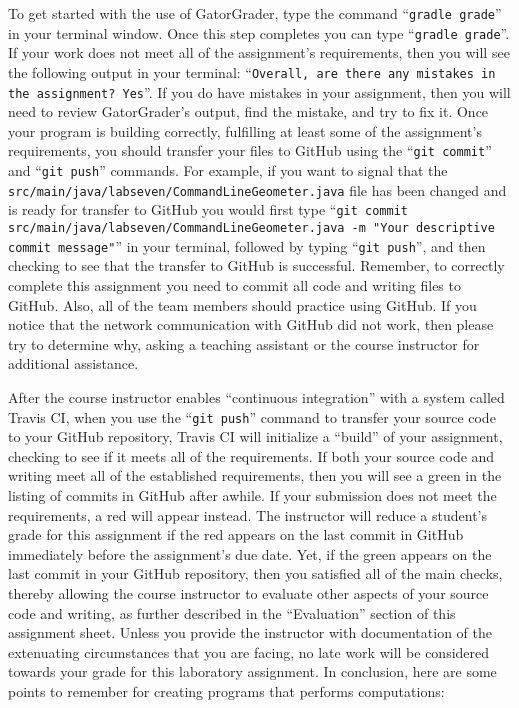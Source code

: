 \documentclass[11pt]{article}
\newcommand{\mainprogramsource}{\lstinline{src/main/java/labseven/CommandLineGeometer.java}}
\newcommand{\gatorgraderstart}{\command{gradle grade}}
\newcommand{\gatorgradercheck}{\command{gradle grade}}
\newcommand{\gitcommit}{\command{git commit}}
\newcommand{\gitpush}{\command{git push}}
\newcommand{\gitcommitmainprogram}{\command{git commit src/main/java/labseven/CommandLineGeometer.java -m "Your
descriptive commit message"}}
\newcommand{\command}[1]{``\lstinline{#1}''}
\newcommand{\step}[1]{``{#1}''}
\newcommand{\checkmark}{\ding{51}}
\newcommand{\naughtmark}{\ding{55}}
\begin{document}
To get started with the use of GatorGrader, type the command \gatorgraderstart{} in your terminal window. Once this step
completes you can type \gatorgradercheck{}. If your work does not meet all of the assignment's requirements, then you
will see the following output in your terminal: \command{Overall, are there any mistakes in the assignment? Yes}. If you
do have mistakes in your assignment, then you will need to review GatorGrader's output, find the mistake, and try to fix
it. Once your program is building correctly, fulfilling at least some of the assignment's requirements, you should
transfer your files to GitHub using the \gitcommit{} and \gitpush{} commands. For example, if you want to signal that
the \mainprogramsource{} file has been changed and is ready for transfer to GitHub you would first type
\gitcommitmainprogram{} in your terminal, followed by typing \gitpush{}, and then checking to see that the transfer to
GitHub is successful. Remember, to correctly complete this assignment you need to commit all code and writing files to
GitHub. Also, all of the team members should practice using GitHub. If you notice that the network communication with
GitHub did not work, then please try to determine why, asking a teaching assistant or the course instructor for
additional assistance.

After the course instructor enables \step{continuous integration} with a system called Travis CI, when you use the
\gitpush{} command to transfer your source code to your GitHub repository, Travis CI will initialize a \step{build} of
your assignment, checking to see if it meets all of the requirements. If both your source code and writing meet all of
the established requirements, then you will see a green \checkmark{} in the listing of commits in GitHub after awhile.
If your submission does not meet the requirements, a red \naughtmark{} will appear instead. The instructor will reduce a
student's grade for this assignment if the red \naughtmark{} appears on the last commit in GitHub immediately before the
assignment's due date. Yet, if the green \checkmark{} appears on the last commit in your GitHub repository, then you
satisfied all of the main checks, thereby allowing the course instructor to evaluate other aspects of your source code
and writing, as further described in the \step{Evaluation} section of this assignment sheet. Unless you provide the
instructor with documentation of the extenuating circumstances that you are facing, no late work will be considered
towards your grade for this laboratory assignment. In conclusion, here are some points to remember for creating programs
that performs computations:
\end{document}
